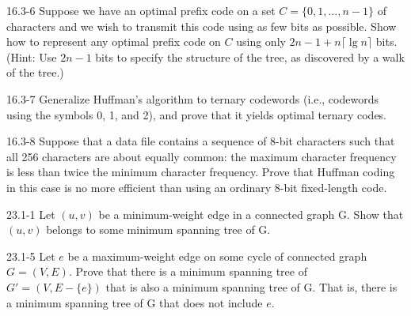 





\homeworkheader{\classnameandsection}

\begin{problem}{16.3-6}
  Suppose we have an optimal prefix code on a set $C = \{0,1,\ldots,n-1\}$ of characters and we wish to transmit this
  code using as few bits as possible. Show how to represent any optimal prefix code on $C$ using only $2n - 1 + n \lceil
  \lg n \rceil$ bits. (Hint: Use $2n - 1$ bits to specify the structure of the tree, as discovered by a walk of the
  tree.)
\end{problem}

\begin{problem}{16.3-7}
  Generalize Huffman's algorithm to ternary codewords (i.e., codewords using the symbols 0, 1, and 2), and prove that it
  yields optimal ternary codes.
\end{problem}

\begin{problem}{16.3-8}
  Suppose that a data file contains a sequence of 8-bit characters such that all 256 characters are about equally
  common: the maximum character frequency is less than twice the minimum character frequency. Prove that Huffman coding
  in this case is no more efficient than using an ordinary 8-bit fixed-length code.
\end{problem}

\begin{problem}{23.1-1}
  Let $(u,v)$ be a minimum-weight edge in a connected graph G. Show that $(u,v)$ belongs to some minimum spanning tree
  of G.
\end{problem}

\begin{problem}{23.1-5}
  Let $e$ be a maximum-weight edge on some cycle of connected graph $G = (V,E)$. Prove that there is a minimum spanning
  tree of $G' = (V,E - \{e\})$ that is also a minimum spanning tree of G. That is, there is a minimum spanning tree of G
  that does not include $e$.
\end{problem}


